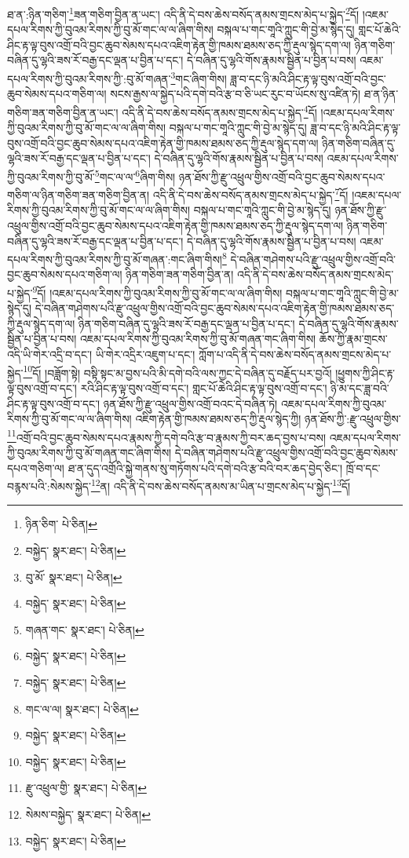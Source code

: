 ཐ་ན་:ཉིན་གཅིག་\footnote{ཉིན་ཅིག་  པེ་ཅིན། }ཟན་གཅིག་བྱིན་ན་ཡང་། འདི་ནི་དེ་བས་ཆེས་བསོད་ནམས་གྲངས་མེད་པ་སྐྱེད་\footnote{བསྐྱེད་  སྣར་ཐང་།  པེ་ཅིན། }དོ། །འཇམ་དཔལ་རིགས་ཀྱི་བུའམ་རིགས་ཀྱི་བུ་མོ་གང་ལ་ལ་ཞིག་གིས། བསྐལ་པ་གང་གཱའི་ཀླུང་གི་བྱེ་མ་སྙེད་དུ། གླང་པོ་ཆེའི་ཤིང་རྟ་ལྟ་བུས་འགྲོ་བའི་བྱང་ཆུབ་སེམས་དཔའ་འཇིག་རྟེན་གྱི་ཁམས་ཐམས་ཅད་ཀྱི་རྡུལ་སྙེད་དག་ལ། ཉིན་གཅིག་བཞིན་དུ་ལྷའི་ཟས་རོ་བརྒྱ་དང་ལྡན་པ་བྱིན་པ་དང་། དེ་བཞིན་དུ་ལྷའི་གོས་རྣམས་སྦྱིན་པ་བྱིན་པ་བས། འཇམ་དཔལ་རིགས་ཀྱི་བུའམ་རིགས་ཀྱི་:བུ་མོ་གཞན་\footnote{བུ་མོ་  སྣར་ཐང་།  པེ་ཅིན། }གང་ཞིག་གིས། ཟླ་བ་དང་ཉི་མའི་ཤིང་རྟ་ལྟ་བུས་འགྲོ་བའི་བྱང་ཆུབ་སེམས་དཔའ་གཅིག་ལ། སངས་རྒྱས་ལ་སྐྱེད་པའི་དགེ་བའི་རྩ་བ་ཅི་ཡང་རུང་བ་ཡོངས་སུ་འཛིན་ཏེ། ཐ་ན་ཉིན་གཅིག་ཟན་གཅིག་བྱིན་ན་ཡང་། འདི་ནི་དེ་བས་ཆེས་བསོད་ནམས་གྲངས་མེད་པ་སྐྱེད་\footnote{བསྐྱེད་  སྣར་ཐང་།  པེ་ཅིན། }དོ། །འཇམ་དཔལ་རིགས་ཀྱི་བུའམ་རིགས་ཀྱི་བུ་མོ་གང་ལ་ལ་ཞིག་གིས། བསྐལ་པ་གང་གཱའི་ཀླུང་གི་བྱེ་མ་སྙེད་དུ། ཟླ་བ་དང་ཉི་མའི་ཤིང་རྟ་ལྟ་བུས་འགྲོ་བའི་བྱང་ཆུབ་སེམས་དཔའ་འཇིག་རྟེན་གྱི་ཁམས་ཐམས་ཅད་ཀྱི་རྡུལ་སྙེད་དག་ལ། ཉིན་གཅིག་བཞིན་དུ་ལྷའི་ཟས་རོ་བརྒྱ་དང་ལྡན་པ་བྱིན་པ་དང་། དེ་བཞིན་དུ་ལྷའི་གོས་རྣམས་སྦྱིན་པ་བྱིན་པ་བས། འཇམ་དཔལ་རིགས་ཀྱི་བུའམ་རིགས་ཀྱི་བུ་མོ་\footnote{གཞན་གང་  སྣར་ཐང་།  པེ་ཅིན། }གང་ལ་ལ་\footnote{བསྐྱེད་  སྣར་ཐང་།  པེ་ཅིན། }ཞིག་གིས། ཉན་ཐོས་ཀྱི་རྫུ་འཕྲུལ་གྱིས་འགྲོ་བའི་བྱང་ཆུབ་སེམས་དཔའ་གཅིག་ལ་ཉིན་གཅིག་ཟན་གཅིག་བྱིན་ན། འདི་ནི་དེ་བས་ཆེས་བསོད་ནམས་གྲངས་མེད་པ་སྐྱེད་\footnote{བསྐྱེད་  སྣར་ཐང་།  པེ་ཅིན། }དོ། །འཇམ་དཔལ་རིགས་ཀྱི་བུའམ་རིགས་ཀྱི་བུ་མོ་གང་ལ་ལ་ཞིག་གིས། བསྐལ་པ་གང་གཱའི་ཀླུང་གི་བྱེ་མ་སྙེད་དུ། ཉན་ཐོས་ཀྱི་རྫུ་འཕྲུལ་གྱིས་འགྲོ་བའི་བྱང་ཆུབ་སེམས་དཔའ་འཇིག་རྟེན་གྱི་ཁམས་ཐམས་ཅད་ཀྱི་རྡུལ་སྙེད་དག་ལ། ཉིན་གཅིག་བཞིན་དུ་ལྷའི་ཟས་རོ་བརྒྱ་དང་ལྡན་པ་བྱིན་པ་དང་། དེ་བཞིན་དུ་ལྷའི་གོས་རྣམས་སྦྱིན་པ་བྱིན་པ་བས། འཇམ་དཔལ་རིགས་ཀྱི་བུའམ་རིགས་ཀྱི་བུ་མོ་གཞན་:གང་ཞིག་གིས།\footnote{གང་ལ་ལ།  སྣར་ཐང་།  པེ་ཅིན། } དེ་བཞིན་གཤེགས་པའི་རྫུ་འཕྲུལ་གྱིས་འགྲོ་བའི་བྱང་ཆུབ་སེམས་དཔའ་གཅིག་ལ། ཉིན་གཅིག་ཟན་གཅིག་བྱིན་ན། འདི་ནི་དེ་བས་ཆེས་བསོད་ནམས་གྲངས་མེད་པ་སྐྱེད་\footnote{བསྐྱེད་  སྣར་ཐང་།  པེ་ཅིན། }དོ། །འཇམ་དཔལ་རིགས་ཀྱི་བུའམ་རིགས་ཀྱི་བུ་མོ་གང་ལ་ལ་ཞིག་གིས། བསྐལ་པ་གང་གཱའི་ཀླུང་གི་བྱེ་མ་སྙེད་དུ། དེ་བཞིན་གཤེགས་པའི་རྫུ་འཕྲུལ་གྱིས་འགྲོ་བའི་བྱང་ཆུབ་སེམས་དཔའ་འཇིག་རྟེན་གྱི་ཁམས་ཐམས་ཅད་ཀྱི་རྡུལ་སྙེད་དག་ལ། ཉིན་གཅིག་བཞིན་དུ་ལྷའི་ཟས་རོ་བརྒྱ་དང་ལྡན་པ་བྱིན་པ་དང་། དེ་བཞིན་དུ་ལྷའི་གོས་རྣམས་སྦྱིན་པ་བྱིན་པ་བས། འཇམ་དཔལ་རིགས་ཀྱི་བུའམ་རིགས་ཀྱི་བུ་མོ་གཞན་གང་ཞིག་གིས། ཆོས་ཀྱི་རྣམ་གྲངས་འདི་ཡི་གེར་འདྲི་བ་དང་། ཡི་གེར་འདྲིར་འཇུག་པ་དང་། ཀློག་པ་འདི་ནི་དེ་བས་ཆེས་བསོད་ནམས་གྲངས་མེད་པ་སྐྱེད་\footnote{བསྐྱེད་  སྣར་ཐང་།  པེ་ཅིན། }དོ། །བཟློག་སྟེ། བསྟི་སྟང་མ་བྱས་པའི་མི་དགེ་བའི་ལས་ཀྱང་དེ་བཞིན་དུ་བརྗོད་པར་བྱའོ། །ཕྱུགས་ཀྱི་ཤིང་རྟ་ལྟ་བུས་འགྲོ་བ་དང་། རའི་ཤིང་རྟ་ལྟ་བུས་འགྲོ་བ་དང་། གླང་པོ་ཆེའི་ཤིང་རྟ་ལྟ་བུས་འགྲོ་བ་དང་། ཉི་མ་དང་ཟླ་བའི་ཤིང་རྟ་ལྟ་བུས་འགྲོ་བ་དང་། ཉན་ཐོས་ཀྱི་རྫུ་འཕྲུལ་གྱིས་འགྲོ་བའང་དེ་བཞིན་ཏེ། འཇམ་དཔལ་རིགས་ཀྱི་བུའམ་རིགས་ཀྱི་བུ་མོ་གང་ལ་ལ་ཞིག་གིས། འཇིག་རྟེན་གྱི་ཁམས་ཐམས་ཅད་ཀྱི་རྡུལ་སྙེད་ཀྱི། ཉན་ཐོས་ཀྱི་:རྫུ་འཕྲུལ་གྱིས་\footnote{རྫུ་འཕྲུལ་གྱི་  སྣར་ཐང་།  པེ་ཅིན། }འགྲོ་བའི་བྱང་ཆུབ་སེམས་དཔའ་རྣམས་ཀྱི་དགེ་བའི་རྩ་བ་རྣམས་ཀྱི་བར་ཆད་བྱས་པ་བས། འཇམ་དཔལ་རིགས་ཀྱི་བུའམ་རིགས་ཀྱི་བུ་མོ་གཞན་གང་ཞིག་གིས། དེ་བཞིན་གཤེགས་པའི་རྫུ་འཕྲུལ་གྱིས་འགྲོ་བའི་བྱང་ཆུབ་སེམས་དཔའ་གཅིག་ལ། ཐ་ན་དུད་འགྲོའི་སྐྱེ་གནས་སུ་གཏོགས་པའི་དགེ་བའི་རྩ་བའི་བར་ཆད་བྱེད་ཅིང་། ཁྲོ་བ་དང་བརྙས་པའི་:སེམས་སྐྱེད་\footnote{སེམས་བསྐྱེད་  སྣར་ཐང་།  པེ་ཅིན། }ན། འདི་ནི་དེ་བས་ཆེས་བསོད་ནམས་མ་ཡིན་པ་གྲངས་མེད་པ་སྐྱེད་\footnote{བསྐྱེད་  སྣར་ཐང་།  པེ་ཅིན། }དོ། 